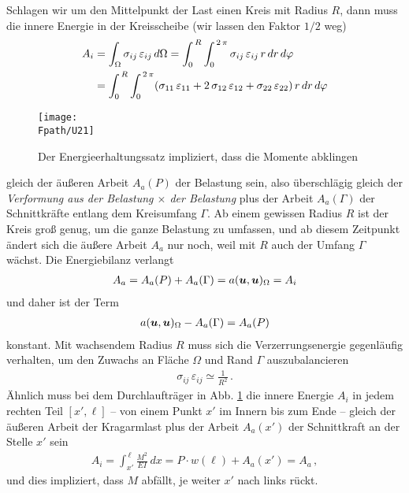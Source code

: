 Schlagen wir um den Mittelpunkt der Last einen Kreis mit Radius $R$, dann muss die innere Energie in der Kreisscheibe (wir lassen den Faktor $1/2$ weg)
\begin{align}
A_i &= \int_{\Omega} \sigma_{ij}\,\varepsilon_{ij}\,d\Omega = \int_0^{\,R} \int_0^{\,2\,\pi}  \sigma_{ij}\,\varepsilon_{ij}\,r\,dr\,d\varphi \nonumber \\
&=  \int_0^{\,R} \int_0^{\,2\,\pi} ( \sigma_{11}\,\varepsilon_{11} + 2\, \sigma_{12}\,\varepsilon_{12} +  \sigma_{22}\,\varepsilon_{22})\,r\,dr\,d\varphi
\end{align}
\begin{figure}
\centering
\if {} \sidecaption[t] \fi
{\texttt{[image: \\Fpath/U21]}}
\caption{Der Energieerhaltungssatz impliziert, dass die Momente abklingen}
\label{U21}%
\end{figure}%
gleich der \"{a}u{\ss}eren Arbeit $A_a(P)$ der Belastung sein, also \"{u}berschl\"{a}gig gleich der {\em Verformung aus der Belastung $\times$ der Belastung\/} plus der Arbeit $A_a(\Gamma)$ der Schnittkr\"{a}fte entlang dem Kreisumfang $\Gamma$. Ab einem gewissen Radius $R$ ist der Kreis gro{\ss} genug, um die ganze Belastung zu umfassen, und ab diesem Zeitpunkt \"{a}ndert sich die \"{a}u{\ss}ere Arbeit $A_a$ nur noch, weil mit $R$ auch der Umfang $\Gamma $ w\"{a}chst. Die Energiebilanz verlangt
\begin{align}
A_a = A_a(P) + A_a(\Gamma) = a(\mbox{\boldmath $u$},\mbox{\boldmath $u$})_{\Omega} = A_i
\end{align}
und daher ist der Term
\begin{align}
a(\mbox{\boldmath $u$},\mbox{\boldmath $u$})_{\Omega} - A_a(\Gamma) = A_a(P)
\end{align}
konstant. Mit wachsendem Radius $R$ muss sich die Verzerrungsenergie gegenl\"{a}ufig verhalten, um den Zuwachs an Fl\"{a}che $\Omega$ und Rand $\Gamma$ auszubalancieren
\begin{align}
\sigma_{ij}\, \varepsilon_{ij} \simeq \frac{1}{R^2}\,.
\end{align}
\"{A}hnlich muss bei dem Durchlauftr\"{a}ger in Abb. \ref{U21} die innere Energie $A_i$ in jedem rechten Teil $[x',\ell]$ -- von einem Punkt $x' $ im Innern bis zum Ende -- gleich der \"{a}u{\ss}eren Arbeit der Kragarmlast plus der Arbeit $A_a(x')$ der Schnittkraft an der Stelle $x'$ sein
\begin{align}
A_i = \int_{x'}^{\,\ell} \frac{M^2}{EI}\,dx = P \cdot w(\ell) + A_a(x') = A_a\,,
\end{align}
und dies impliziert, dass $M$ abf\"{a}llt, je weiter $x'$ nach links r\"{u}ckt.\\

